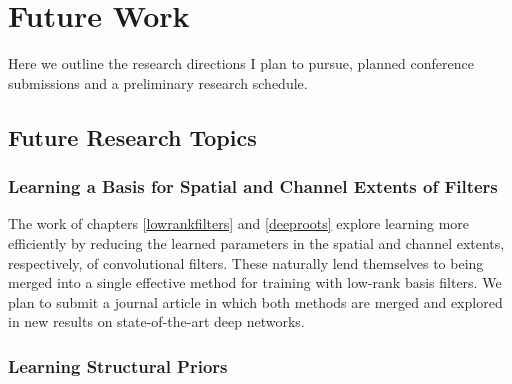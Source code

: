 \documentclass[thesis]{subfiles}
\begin{document}

\chapter{Future Work}  %
\label{futurework}


Here we outline the research directions I plan to pursue, planned conference submissions and a preliminary research schedule.

\section{Future Research Topics}

\subsection{Learning a Basis for Spatial and Channel Extents of Filters}
\label{journalplan}
The work of chapters \ref{lowrankfilters} and \ref{deeproots} explore learning more efficiently by reducing the learned parameters in the spatial and channel extents, respectively, of convolutional filters. These naturally lend themselves to being merged into a single effective method for training with low-rank basis filters. We plan to submit a journal article in which both methods are merged and explored in new results on state-of-the-art deep networks.

\subsection{Learning Structural Priors}
\end{document}
